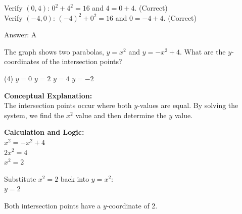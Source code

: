 \documentclass[11pt,paper=a4,answers]{exam}
\begin{document}
\begin{questions}
\begin{solution}
Verify $(0, 4)$: $0^2 + 4^2 = 16$ and $4 = 0 + 4$. (Correct) \\
Verify $(-4, 0)$: $(-4)^2 + 0^2 = 16$ and $0 = -4 + 4$. (Correct)

\vspace{25pt}

Answer: \colorbox{yellow!100}{A}
\end{solution}

\vspace{40pt}

\question
\begin{center}
\end{center}
The graph shows two parabolas, $y = x^2$ and $y = -x^2 + 4$. What are the $y$-coordinates of the intersection points?
\begin{tasks}(4)
    \task $y = 0$
    \task $y = 2$
    \task $y = 4$
    \task $y = -2$
\end{tasks}

\begin{solution}
\textbf{Conceptual Explanation:} \\
The intersection points occur where both $y$-values are equal. By solving the system, we find the $x^2$ value and then determine the $y$ value.

\vspace{20pt}

\textbf{Calculation and Logic:} \\
$x^2 = -x^2 + 4$ \\
$2x^2 = 4$ \\
$x^2 = 2$

\vspace{10pt}

Substitute $x^2 = 2$ back into $y = x^2$: \\
$y = 2$

\vspace{10pt}

Both intersection points have a $y$-coordinate of 2.

\vspace{25pt}


\end{solution}
\end{questions}
\end{document}
